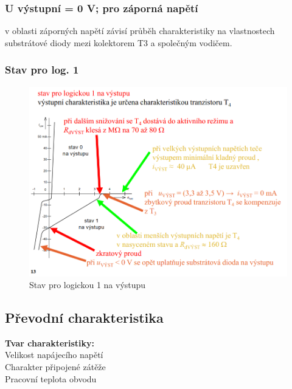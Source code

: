 \subsubsection{U výstupní = 0 V; pro záporná napětí}
v oblasti záporných napětí závisí průběh charakteristiky na vlastnostech substrátové diody mezi kolektorem T3 a společným vodičem.
\newpage
\subsubsection{Stav pro log. 1}  
     \begin{figure}[h]
   \begin{center}
     \includegraphics[scale=0.6]{images/Log1.png}
   \end{center}
   \caption{Stav pro logickou 1 na výstupu}
  \end{figure}
  
\newpage
 \subsection{Převodní charakteristika}
 \textbf{Tvar charakteristiky:}\\
Velikost napájecího napětí\\
Charakter připojené zátěže\\
Pracovní teplota obvodu\\

